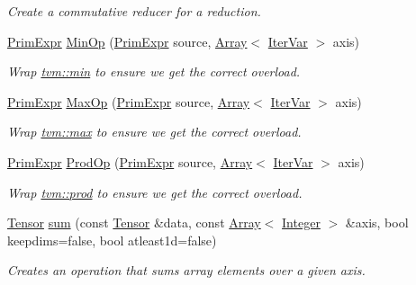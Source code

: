 \begin{DoxyCompactItemize}
\begin{DoxyCompactList}\small\item\em Create a commutative reducer for a reduction. \end{DoxyCompactList}\item 
\hyperlink{classtvm_1_1PrimExpr}{Prim\+Expr} \hyperlink{namespacetopi_a6c5fe35d3ea473bad1b9bed302a52dd3}{Min\+Op} (\hyperlink{classtvm_1_1PrimExpr}{Prim\+Expr} source, \hyperlink{classtvm_1_1Array}{Array}$<$ \hyperlink{classtvm_1_1tir_1_1IterVar}{Iter\+Var} $>$ axis)
\begin{DoxyCompactList}\small\item\em Wrap \hyperlink{namespacetvm_a9da780393e228969f77aa7550520a582}{tvm\+::min} to ensure we get the correct overload. \end{DoxyCompactList}\item 
\hyperlink{classtvm_1_1PrimExpr}{Prim\+Expr} \hyperlink{namespacetopi_acb514e2dc2e6d45d6a4c5f0670b367e1}{Max\+Op} (\hyperlink{classtvm_1_1PrimExpr}{Prim\+Expr} source, \hyperlink{classtvm_1_1Array}{Array}$<$ \hyperlink{classtvm_1_1tir_1_1IterVar}{Iter\+Var} $>$ axis)
\begin{DoxyCompactList}\small\item\em Wrap \hyperlink{namespacetvm_ab49bad0808ba033343e72ba37b39af2e}{tvm\+::max} to ensure we get the correct overload. \end{DoxyCompactList}\item 
\hyperlink{classtvm_1_1PrimExpr}{Prim\+Expr} \hyperlink{namespacetopi_afef081e81c9674d23b70aeced0df44a9}{Prod\+Op} (\hyperlink{classtvm_1_1PrimExpr}{Prim\+Expr} source, \hyperlink{classtvm_1_1Array}{Array}$<$ \hyperlink{classtvm_1_1tir_1_1IterVar}{Iter\+Var} $>$ axis)
\begin{DoxyCompactList}\small\item\em Wrap \hyperlink{namespacetvm_afd8718fe1f413ab2850cdbb66adfbecc}{tvm\+::prod} to ensure we get the correct overload. \end{DoxyCompactList}\item 
\hyperlink{classtvm_1_1te_1_1Tensor}{Tensor} \hyperlink{namespacetopi_a21ec078212b70fdbf3ff44188d9e2ee9}{sum} (const \hyperlink{classtvm_1_1te_1_1Tensor}{Tensor} \&data, const \hyperlink{classtvm_1_1Array}{Array}$<$ \hyperlink{classtvm_1_1Integer}{Integer} $>$ \&axis, bool keepdims=false, bool atleast1d=false)
\begin{DoxyCompactList}\small\item\em Creates an operation that sums array elements over a given axis. \end{DoxyCompactList}\item 

\end{DoxyCompactItemize}
